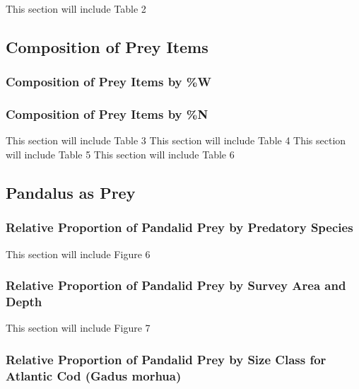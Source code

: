\documentclass[
]{article}
\begin{document}
This section will include Table 2

\hypertarget{composition-of-prey-items}{%
\subsection{Composition of Prey Items}\label{composition-of-prey-items}}

\hypertarget{composition-of-prey-items-by-w}{%
\subsubsection{Composition of Prey Items by
\%W}\label{composition-of-prey-items-by-w}}

\hypertarget{composition-of-prey-items-by-n}{%
\subsubsection{Composition of Prey Items by
\%N}\label{composition-of-prey-items-by-n}}

This section will include Table 3 This section will include Table 4 This
section will include Table 5 This section will include Table 6

\hypertarget{pandalus-as-prey}{%
\subsection{Pandalus as Prey}\label{pandalus-as-prey}}

\hypertarget{relative-proportion-of-pandalid-prey-by-predatory-species}{%
\subsubsection{Relative Proportion of Pandalid Prey by Predatory
Species}\label{relative-proportion-of-pandalid-prey-by-predatory-species}}

This section will include Figure 6

\hypertarget{relative-proportion-of-pandalid-prey-by-survey-area-and-depth}{%
\subsubsection{Relative Proportion of Pandalid Prey by Survey Area and
Depth}\label{relative-proportion-of-pandalid-prey-by-survey-area-and-depth}}

This section will include Figure 7

\hypertarget{relative-proportion-of-pandalid-prey-by-size-class-for-atlantic-cod-gadus-morhua}{%
\subsubsection{\texorpdfstring{Relative Proportion of Pandalid Prey by
Size Class for Atlantic Cod (\textbf{Gadus
morhua})}{Relative Proportion of Pandalid Prey by Size Class for Atlantic Cod (Gadus morhua)}}\label{relative-proportion-of-pandalid-prey-by-size-class-for-atlantic-cod-gadus-morhua}}
\end{document}
